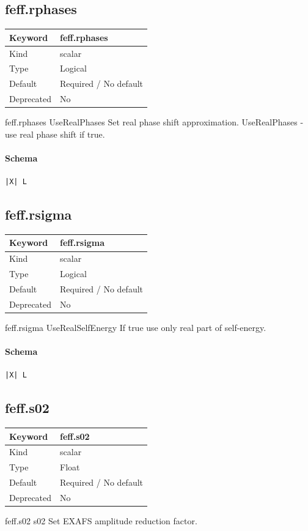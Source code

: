 \documentclass[11pt]{article}
\begin{document}
{{{{\subsection{feff.rphases}
\label{kw:feff-rphases}
\begin{longtable}{|p{1.5in}|p{4.5in}|}
\hline
Keyword & feff.rphases \\
\hline
Kind & scalar \\
\hline
Type & Logical \\
\hline
Default & Required / No default \\
\hline
Deprecated & No \\
\hline
\end{longtable}
 feff.rphases{ UseRealPhases }
 Set real phase shift approximation.
 UseRealPhases - use real phase shift if true.

\paragraph{Schema}
\begin{Verbatim}
|X| L
\end{Verbatim}

\subsection{feff.rsigma}
\label{kw:feff-rsigma}
\begin{longtable}{|p{1.5in}|p{4.5in}|}
\hline
Keyword & feff.rsigma \\
\hline
Kind & scalar \\
\hline
Type & Logical \\
\hline
Default & Required / No default \\
\hline
Deprecated & No \\
\hline
\end{longtable}
 feff.rsigma{ UseRealSelfEnergy }
 If true use only real part of self-energy.

\paragraph{Schema}
\begin{Verbatim}
|X| L
\end{Verbatim}

\subsection{feff.s02}
\label{kw:feff-s02}
\begin{longtable}{|p{1.5in}|p{4.5in}|}
\hline
Keyword & feff.s02 \\
\hline
Kind & scalar \\
\hline
Type & Float \\
\hline
Default & Required / No default \\
\hline
Deprecated & No \\
\hline
\end{longtable}
 feff.s02{ s02 }
 Set EXAFS amplitude reduction factor.

}}}}
\end{document}
